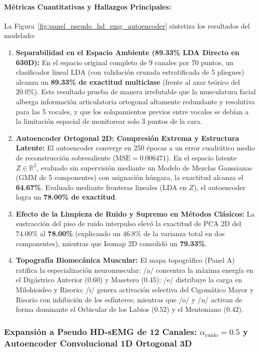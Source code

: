 \documentclass[11pt,a4paper,openany]{book}
\theoremstyle{definition}
\begin{document}
\paragraph{Métricas Cuantitativas y Hallazgos Principales:}
La Figura~\ref{fig:panel_pseudo_hd_emg_autoencoder} sintetiza los resultados del modelado:
\begin{enumerate}
    \item \textbf{Separabilidad en el Espacio Ambiente (89.33\% LDA Directo en 630D):}
    En el espacio original completo de 9 canales por 70 puntos, un clasificador lineal LDA (con validación cruzada estratificada de 5 pliegues) alcanza un \textbf{89.33\% de exactitud multiclase} (frente al azar teórico del $20.0\%$). Este resultado prueba de manera irrefutable que la musculatura facial alberga información articulatoria ortogonal altamente redundante y resolutiva para las 5 vocales, y que los solapamientos previos entre vocales se debían a la limitación espacial de monitorear solo 3 puntos de la cara.
    \item \textbf{Autoencoder Ortogonal 2D: Compresión Extrema y Estructura Latente:}
    El autoencoder converge en 250 épocas a un error cuadrático medio de reconstrucción sobresaliente ($\text{MSE} = 0.006471$). En el espacio latente $Z \in \mathbb{R}^2$, evaluado sin supervisión mediante un Modelo de Mezclas Gaussianas (GMM de 5 componentes) con asignación húngara, la exactitud alcanza el \textbf{64.67\%}. Evaluado mediante fronteras lineales (LDA en $Z$), el autoencoder logra un \textbf{78.00\% de exactitud}.
    \item \textbf{Efecto de la Limpieza de Ruido y Supremo en Métodos Clásicos:}
    La sustracción del piso de ruido interpulso elevó la exactitud de PCA 2D del $74.00\%$ al \textbf{78.00\%} (explicando un $46.8\%$ de la varianza total en dos componentes), mientras que Isomap 2D consolidó un \textbf{79.33\%}.
    \item \textbf{Topografía Biomecánica Muscular:}
    El mapa topográfico (Panel A) ratifica la especialización neuromuscular: /a/ concentra la máxima energía en el Digástrico Anterior ($0.60$) y Masetero ($0.45$); /e/ distribuye la carga en Milohioideo y Risorio; /i/ genera activación selectiva del Cigomático Mayor y Risorio con inhibición de los esfínteres; mientras que /o/ y /u/ activan de forma dominante el Orbicular de los Labios ($0.52$) y el Mentoniano ($0.42$).
\end{enumerate}

\subsubsection{Expansión a Pseudo HD-sEMG de 12 Canales: $\alpha_{\text{ruido}}=0.5$ y Autoencoder Convolucional 1D Ortogonal 3D}
\label{subsubsec:pseudo_hd_emg_12ch_conv3d}
\end{document}
